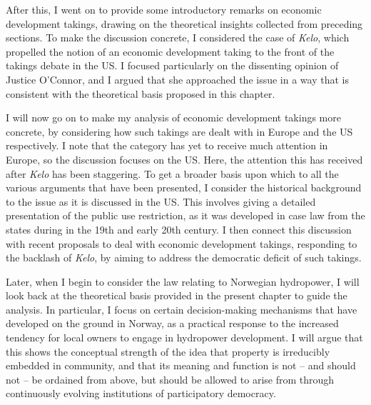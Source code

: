 After this, I went on to provide some introductory remarks on economic development takings, drawing on the theoretical insights collected from preceding sections. To make the discussion concrete, I considered the case of {\it Kelo}, which propelled the notion of an economic development taking to the front of the takings debate in the US. I focused particularly on the dissenting opinion of Justice O'Connor, and I argued that she approached the issue in a way that is consistent with the theoretical basis proposed in this chapter.

I will now go on to make my analysis of economic development takings more concrete, by considering how such takings are dealt with in Europe and the US respectively. I note that the category has yet to receive much attention in Europe, so the discussion focuses on the US. Here, the attention this  has received after {\it Kelo} has been staggering. To get a broader basis upon which to  all the various arguments that have been presented, I consider the historical background to the issue as it is discussed in the US. This involves giving a detailed presentation of the public use restriction, as it was developed in case law from the states during in the 19th and early 20th century. I then connect this discussion with recent proposals to deal with economic development takings, responding to the backlash of {\it Kelo}, by aiming to address the democratic deficit of such takings.

Later, when I begin to consider the law relating to Norwegian hydropower, I will look back at the theoretical basis provided in the present chapter to guide the analysis. In particular, I focus on certain decision-making mechanisms that have developed on the ground in Norway, as a practical response to the increased tendency for local owners to engage in hydropower development. I will argue that this shows the conceptual strength of the idea that property is irreducibly embedded in community, and that its meaning and function is not -- and should not -- be ordained from above, but should be allowed to arise from  through continuously evolving institutions of participatory democracy.